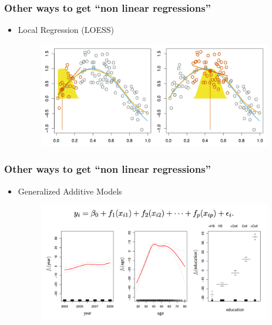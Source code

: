 \documentclass[xcolor={dvipsnames}]{beamer}
\begin{document}
\frame
{
 \frametitle{Other ways to get ``non linear regressions''}
 \begin{itemize}
 
 \item Local Regression (LOESS)
\begin{figure}
\centering
\includegraphics[width=4in]{stuff/loess.png} 
\end{figure}

\end{itemize}
}

\frame
{
 \frametitle{Other ways to get ``non linear regressions''}
 \begin{itemize}


 \item Generalized Additive Models
 
\begin{figure}
\centering
 \includegraphics[width=4in]{stuff/gam.png} 

\end{figure}

 \end{itemize}
 
}
\end{document}
